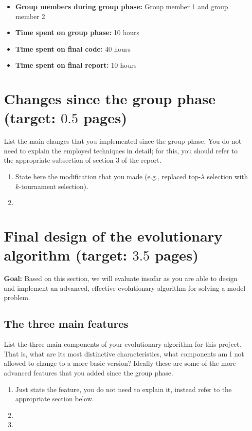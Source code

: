 \documentclass[a4paper,10pt]{article}
\newcommand{\ReplaceMe}[1]{{\color{blue}#1}}
\newcommand{\RemoveMe}[1]{{\color{purple}#1}}
\begin{document}
\begin{itemize}
 \item \textbf{Group members during group phase:} \ReplaceMe{Group member 1} and \ReplaceMe{group member 2}
 \item \textbf{Time spent on group phase:} \ReplaceMe{10 hours}
 \item \textbf{Time spent on final code:} \ReplaceMe{40 hours}
 \item \textbf{Time spent on final report:} \ReplaceMe{10 hours}
\end{itemize}

\section{Changes since the group phase (target: $0.5$ pages)} 

\ReplaceMe{List the main changes that you implemented since the group phase. You do not need to explain the employed techniques in detail; for this, you should refer to the appropriate subsection of section 3 of the report.}

\begin{enumerate}
 \item \ReplaceMe{State here the modification that you made (e.g., replaced top-$\lambda$ selection with $k$-tournament selection).}
 \item 
\end{enumerate}

\section{Final design of the evolutionary algorithm (target: $3.5$ pages)} 

\RemoveMe{\textbf{Goal:} Based on this section, we will evaluate insofar as you are able to design and implement an advanced, effective evolutionary algorithm for solving a model problem.}


\subsection{The three main features}
\ReplaceMe{List the three main components of your evolutionary algorithm for this project. That is, what are its most distinctive characteristics, what components am I not allowed to change to a more basic version? Ideally these are some of the more advanced features that you added since the group phase.}

\begin{enumerate}
 \item \ReplaceMe{Just state the feature, you do not need to explain it, instead refer to the appropriate section below.}
 \item 
 \item
\end{enumerate}
\end{document}
